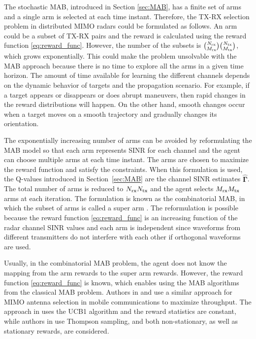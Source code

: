 \documentclass[english, 12pt, a4paper, elec, utf8, a-1b, online]{aaltothesis}
\numberwithin{equation}{section}
\newcommand{\vsinrb}{\widehat{\boldsymbol{\Gamma}}}
\begin{document}
The stochastic MAB, introduced in Section \ref{sec:MAB}, has a finite set of arms and a single arm is selected at each time instant.
Therefore, the TX-RX selection problem in distributed MIMO radars could be formulated as follows.
An arm could be a subset of TX-RX pairs and the reward is calculated using the reward function \eqref{eq:reward_func}.
However, the number of the subsets is $\binom{{N_{\text{rx}}}}{{M_{\text{rx}}}}\binom{{N_{\text{tx}}}}{{M_{\text{tx}}}}$, which grows exponentially. This could make the problem unsolvable with the MAB approach because there is no time to explore all the arms in a given time horizon.
The amount of time available for learning the different channels depends on the dynamic behavior of targets and the propagation scenario.
For example, if a target appears or disappears or does abrupt maneuvers, then rapid changes in the reward distributions will happen. 
On the other hand, smooth changes occur when a target moves on a smooth trajectory and gradually changes its orientation.

The exponentially increasing number of arms can be avoided by reformulating the MAB model so that each arm represents SINR for each channel and the agent can choose multiple arms at each time instant.
The arms are chosen to maximize the reward function and satisfy the constraints.
When this formulation is used, the Q-values introduced in Section~\ref{sec:MAB} are the channel SINR estimates $\vsinrb$.
The total number of arms is reduced to ${N_{\text{rx}}}{N_{\text{tx}}}$ and the agent selects ${M_{\text{rx}}}{M_{\text{tx}}}$ arms at each iteration.
The formulation is known as the combinatorial MAB, in which the subset of arms is called a super arm \cite{Chen2014}.
The reformulation is possible because the reward function \eqref{eq:reward_func} is an increasing function of the radar channel SINR values and each arm is independent since waveforms from different transmitters do not interfere with each other if orthogonal waveforms are used.

Usually, in the combinatorial MAB problem, the agent does not know the mapping from the arm rewards to the super arm rewards.
However, the reward function \eqref{eq:reward_func} is known, which enables using the MAB algorithms from the classical MAB problem.
Authors in \cite{Mukherjee2012} and \cite{Kuai2019} use a similar approach for MIMO antenna selection in mobile communications to maximize throughput.
The approach in \cite{Mukherjee2012} uses the UCB1 algorithm and the reward statistics are constant, while authors in \cite{Kuai2019} use Thompson sampling, and both non-stationary, as well as stationary rewards, are considered.
\end{document}
